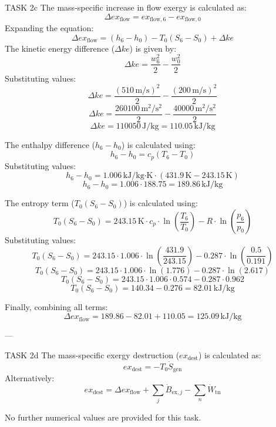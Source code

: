 TASK 2c  
The mass-specific increase in flow exergy is calculated as:  
\[
\Delta ex_{\text{flow}} = ex_{\text{flow},6} - ex_{\text{flow},0}
\]  
Expanding the equation:  
\[
\Delta ex_{\text{flow}} = (h_6 - h_0) - T_0(S_6 - S_0) + \Delta ke
\]  
The kinetic energy difference (\( \Delta ke \)) is given by:  
\[
\Delta ke = \frac{w_6^2}{2} - \frac{w_0^2}{2}
\]  
Substituting values:  
\[
\Delta ke = \frac{(510 \, \text{m/s})^2}{2} - \frac{(200 \, \text{m/s})^2}{2}
\]  
\[
\Delta ke = \frac{260100 \, \text{m}^2/\text{s}^2}{2} - \frac{40000 \, \text{m}^2/\text{s}^2}{2}
\]  
\[
\Delta ke = 110050 \, \text{J/kg} = 110.05 \, \text{kJ/kg}
\]  

The enthalpy difference (\( h_6 - h_0 \)) is calculated using:  
\[
h_6 - h_0 = c_p(T_6 - T_0)
\]  
Substituting values:  
\[
h_6 - h_0 = 1.006 \, \text{kJ/kg·K} \cdot (431.9 \, \text{K} - 243.15 \, \text{K})
\]  
\[
h_6 - h_0 = 1.006 \cdot 188.75 = 189.86 \, \text{kJ/kg}
\]  

The entropy term (\( T_0(S_6 - S_0) \)) is calculated using:  
\[
T_0(S_6 - S_0) = 243.15 \, \text{K} \cdot c_p \cdot \ln\left(\frac{T_6}{T_0}\right) - R \cdot \ln\left(\frac{p_6}{p_0}\right)
\]  
Substituting values:  
\[
T_0(S_6 - S_0) = 243.15 \cdot 1.006 \cdot \ln\left(\frac{431.9}{243.15}\right) - 0.287 \cdot \ln\left(\frac{0.5}{0.191}\right)
\]  
\[
T_0(S_6 - S_0) = 243.15 \cdot 1.006 \cdot \ln(1.776) - 0.287 \cdot \ln(2.617)
\]  
\[
T_0(S_6 - S_0) = 243.15 \cdot 1.006 \cdot 0.574 - 0.287 \cdot 0.962
\]  
\[
T_0(S_6 - S_0) = 140.34 - 0.276 = 82.01 \, \text{kJ/kg}
\]  

Finally, combining all terms:  
\[
\Delta ex_{\text{flow}} = 189.86 - 82.01 + 110.05 = 125.09 \, \text{kJ/kg}
\]  

---

TASK 2d  
The mass-specific exergy destruction (\( ex_{\text{dest}} \)) is calculated as:  
\[
ex_{\text{dest}} = -T_0 \dot{S}_{\text{gen}}
\]  
Alternatively:  
\[
ex_{\text{dest}} = \Delta ex_{\text{flow}} + \sum_j \dot{B}_{\text{ex},j} - \sum_n \dot{W}_{\text{tn}}
\]  

No further numerical values are provided for this task.